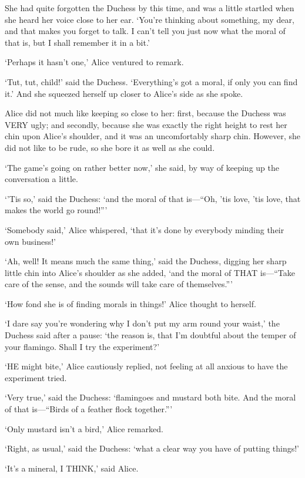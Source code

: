 \documentclass[12pt]{article}
\begin{document}
\begin{Parallel}[p]{}{}
{She had quite forgotten the Duchess by this time, and was a little startled when she heard her voice close to her ear. ‘You’re thinking about something, my dear, and that makes you forget to talk. I can’t tell you just now what the moral of that is, but I shall remember it in a bit.’

‘Perhaps it hasn’t one,’ Alice ventured to remark.

‘Tut, tut, child!’ said the Duchess. ‘Everything’s got a moral, if only you can find it.’ And she squeezed herself up closer to Alice’s side as she spoke.

Alice did not much like keeping so close to her: first, because the Duchess was VERY ugly; and secondly, because she was exactly the right height to rest her chin upon Alice’s shoulder, and it was an uncomfortably sharp chin. However, she did not like to be rude, so she bore it as well as she could.

‘The game’s going on rather better now,’ she said, by way of keeping up the conversation a little.

‘’Tis so,’ said the Duchess: ‘and the moral of that is—“Oh, ’tis love, ’tis love, that makes the world go round!”’

‘Somebody said,’ Alice whispered, ‘that it’s done by everybody minding their own business!’

‘Ah, well! It means much the same thing,’ said the Duchess, digging her sharp little chin into Alice’s shoulder as she added, ‘and the moral of THAT is—“Take care of the sense, and the sounds will take care of themselves.”’

‘How fond she is of finding morals in things!’ Alice thought to herself.

‘I dare say you’re wondering why I don’t put my arm round your waist,’ the Duchess said after a pause: ‘the reason is, that I’m doubtful about the temper of your flamingo. Shall I try the experiment?’

‘HE might bite,’ Alice cautiously replied, not feeling at all anxious to have the experiment tried.

‘Very true,’ said the Duchess: ‘flamingoes and mustard both bite. And the moral of that is—“Birds of a feather flock together.”’

‘Only mustard isn’t a bird,’ Alice remarked.

‘Right, as usual,’ said the Duchess: ‘what a clear way you have of putting things!’

‘It’s a mineral, I THINK,’ said Alice.

}
\end{Parallel}
\end{document}
